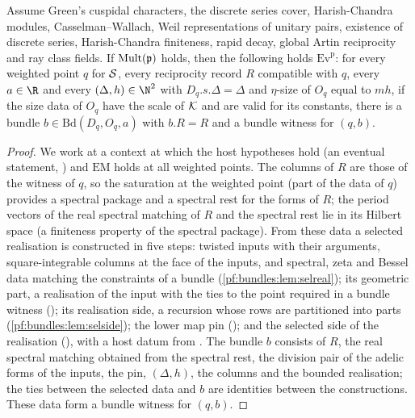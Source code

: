 \begin{lemma}\label{pf:bundles:lem:bwit}
Assume Green's cuspidal characters, the discrete series cover, Harish-Chandra modules, Casselman--Wallach, Weil representations of
unitary pairs, existence of discrete series, Harish-Chandra finiteness, rapid decay, global Artin reciprocity and ray class fields. If
$\mathrm{Mult}(\mathfrak p)$ holds, then the following holds $\mathrm{Ev}^{\mathrm p}$: for every weighted point $q$ for $\mathcal S$, every
reciprocity record $R$ compatible with $q$, every $a\in\R$ and every $(\Delta,h)\in\N^2$ with $D_q.s.\Delta=\Delta$ and $\eta$-size of
$O_q$ equal to $mh$, if the size data of $O_q$ have the scale of $\mathcal K$ and are valid for its constants, there is a bundle
$b\in\mathrm{Bd}(D_q,O_q,a)$ with $b.R=R$ and a bundle witness for $(q,b)$.
\end{lemma}

\begin{proof}
We work at a context at which the host hypotheses hold (an eventual statement,
) and $\mathrm{EM}$ holds at all weighted points. The columns of $R$ are those
of the witness of $q$, so the saturation at the weighted point (part of the data of $q$) provides a spectral package and a spectral rest
for the forms of $R$; the period vectors of the real spectral matching of $R$ and the spectral rest lie in its Hilbert space (a
finiteness property of the spectral package). From these data a selected realisation is constructed in five steps:
twisted inputs with their arguments, square-integrable columns at the face of the inputs, and spectral, zeta and Bessel data matching
the constraints of a bundle (\cref{pf:bundles:lem:selreal}); its geometric part, a realisation of the input
with the ties to the point required in a bundle witness (); its realisation
side, a recursion whose rows are partitioned into parts (\cref{pf:bundles:lem:selside}); the lower map pin
(); and the selected side of the realisation
(), with a host datum from
. The bundle $b$ consists of $R$, the real spectral matching obtained from
the spectral rest, the division pair of the adelic forms of the inputs, the pin, $(\Delta,h)$, the columns and the bounded realisation;
the ties between the selected data and $b$ are identities between the constructions. These data form a bundle witness for $(q,b)$.
\end{proof}


